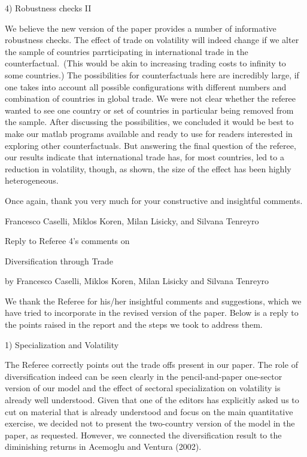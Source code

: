 \documentclass[12pt]{article}
\begin{document}
4) Robustness checks II

We believe the new version of the paper provides a number of informative
robustness checks. The effect of trade on volatility will indeed change if
we alter the sample of countries parrticipating in international trade in
the counterfactual.\ (This would be akin to increasing trading costs to
infinity to some countries.) The possibilities for counterfactuals here are
incredibly large, if one takes into account all possible configurations with
different numbers and combination of countries in global trade. We were not
clear whether the referee wanted to see one country or set of countries in
particular being removed from the sample. After discussing the
possibilities, we concluded it would be best to make our matlab programs
available and ready to use for readers interested in exploring other
counterfactuals. But answering the final question of the referee, our
results indicate that international trade has, for most countries, led to a
reduction in volatility, though, as shown, the size of the effect has been
highly heterogeneous.

\medskip \medskip \bigskip

Once again, thank you very much for your constructive and insightful
comments.

Francesco Caselli, Miklos Koren, Milan Lisicky, and Silvana Tenreyro

\pagebreak

\begin{center}
\thispagestyle{plain}\setcounter{page}{1}

Reply to Referee 4's comments on

{\Large Diversification through Trade}

by Francesco Caselli, Miklos Koren, Milan Lisicky and Silvana
Tenreyro\medskip \medskip \bigskip
\end{center}

We thank the Referee for his/her insightful comments and suggestions, which
we have tried to incorporate in the revised version of the paper. Below is a
reply to the points raised in the report and the steps we took to address
them.

\bigskip

1) Specialization and Volatility

The Referee correctly points out the trade offs present in our paper. The
role of diversification indeed can be seen clearly in the pencil-and-paper
one-sector version of our model and the effect of sectoral specialization on
volatility is already well understood. Given that one of the editors has
explicitly asked us to cut on material that is already understood and focus
on the main quantitative exercise, we decided not to present the two-country
version of the model in the paper, as requested. However, we connected the
diversification result to the diminishing returns in Acemoglu and Ventura
(2002). 
\end{document}
